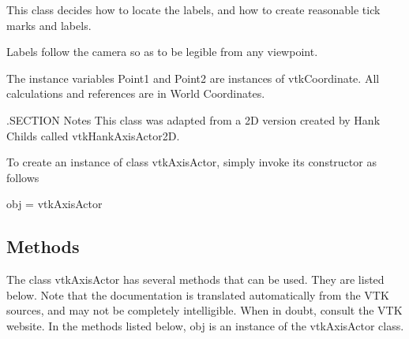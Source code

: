 This class decides how to locate the labels, and how to create reasonable tick marks and labels.

Labels follow the camera so as to be legible from any viewpoint.

The instance variables Point1 and Point2 are instances of vtk\-Coordinate. All calculations and references are in World Coordinates.

.S\-E\-C\-T\-I\-O\-N Notes This class was adapted from a 2\-D version created by Hank Childs called vtk\-Hank\-Axis\-Actor2\-D.

To create an instance of class vtk\-Axis\-Actor, simply invoke its constructor as follows \begin{DoxyVerb}  obj = vtkAxisActor
\end{DoxyVerb}
 \hypertarget{vtkwidgets_vtkxyplotwidget_Methods}{}\subsection{Methods}\label{vtkwidgets_vtkxyplotwidget_Methods}
The class vtk\-Axis\-Actor has several methods that can be used. They are listed below. Note that the documentation is translated automatically from the V\-T\-K sources, and may not be completely intelligible. When in doubt, consult the V\-T\-K website. In the methods listed below, {\ttfamily obj} is an instance of the vtk\-Axis\-Actor class. 
